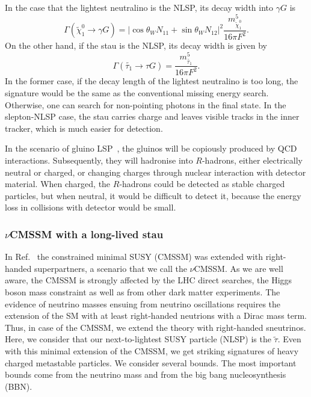 \documentclass[10pt]{article}
\begin{document}
In the case that the lightest neutralino is the NLSP, its decay width into $\gamma G$ is~\cite{Dimopoulos:1996yq}
%
\begin{equation}
\Gamma (\tilde{\chi}^0_1 \to \gamma G) = \left| 
\cos\theta_W N_{11} + \sin\theta_W N_{12} \right |^2 
\frac{m^5_{\tilde{\chi}^0_1 } }{16 \pi F^2}.
\end{equation}
%
On the other hand, if the stau is the NLSP, its decay width is given by
%
\begin{equation}
\Gamma (\tilde{\tau_1} \to \tau G) = 
\frac{m^5_{\tilde{\tau_1} }}{16 \pi F^2}.
\end{equation}
%
In the former case, if the decay length of the lightest neutralino is too long, the signature would be the same as the conventional missing energy search.
Otherwise, one can search for non-pointing photons in the final state.
In the slepton-NLSP case, the stau carries charge and leaves visible tracks in the inner tracker, which is much easier for detection.

In the scenario of gluino LSP~\cite{Baer:1998pg,Raby:1998xr}, the gluinos will be copiously produced by QCD interactions. Subsequently, they will hadronise into $R$-hadrons, either electrically neutral or charged, or changing charges through nuclear interaction with detector material. When charged, the $R$-hadrons could be detected as stable charged particles, but when neutral, it would be difficult to detect it, because the energy loss in collisions with detector would be small. 


\subsubsection[$\nu$CMSSM with a long-lived stau]{\boldmath $\nu$CMSSM with a long-lived stau}
%
In Ref.~\cite{Banerjee:2016uyt} the constrained minimal SUSY (CMSSM) was extended with right-handed superpartners, a scenario that we call the $\nu$CMSSM. As we are well aware, the CMSSM is strongly affected by the LHC direct searches, the Higgs boson mass constraint as well as from other dark matter experiments. The evidence of neutrino masses  ensuing from neutrino oscillations requires the extension of the SM with at least right-handed neutrions with a Dirac mass term. Thus, in case of the CMSSM, we extend the theory with right-handed sneutrinos. Here, we consider that our next-to-lightest SUSY particle (NLSP) is the $\tilde{\tau}$. Even with this minimal extension of the CMSSM, we get striking signatures of heavy charged metastable particles. We consider several bounds. The most important bounds come from the neutrino mass and from the big bang nucleosynthesis (BBN). 
\end{document}
